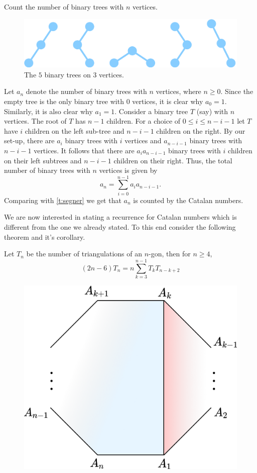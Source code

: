 \begin{question}
Count the number of binary trees with $n$ vertices.
\end{question}
\begin{figure}[H]
    \centering
    \includegraphics[width=0.7\linewidth]{Images/Figure23.png}
    \caption{The $5$ binary trees on $3$ vertices.}
\end{figure}
\begin{solution}
Let $a_n$ denote the number of binary trees with $n$ vertices, where $n\geq 0$. Since the empty tree is the only binary tree with $0$ vertices, it is clear why $a_0 = 1$. Similarly, it is also clear why $a_1=1$. Consider a binary tree $T$ (say) with $n$ vertices. The root of $T$ has $n-1$ children. For a choice of $0\leq i\leq n-i-1$ let $T$ have $i$ children on the left sub-tree and $n-i-1$ children on the right. By our set-up, there are $a_i$ binary trees with $i$ vertices and $a_{n-i-1}$ binary trees with $n-i-1$ vertices. It follows that there are $a_i a_{n-i-1}$ binary trees with $i$ children on their left subtrees and $n-i-1$ children on their right. Thus, the total number of binary trees with $n$ vertices is given by
\[
a_n = \sum_{i=0}^{n-1}a_ia_{n-i-1}.
\]
Comparing with \cref{t:segner} we get that $a_n$ is counted by the Catalan numbers. 
\end{solution}
We are now interested in stating a recurrence for Catalan numbers which is different from the one we already stated. To this end consider the following theorem and it's corollary. 
\begin{theorem}
    Let $T_n$ be the number of triangulations of an $n$-gon, then for $n\geq 4$,
    \[
    (2n-6)T_n = n\sum_{k=3}^{n-1}T_kT_{n-k+2}
    \]
\end{theorem}
\begin{figure}[H]
    \centering
    \includegraphics[width=0.45\linewidth]{Images/Figure22.png}
    \caption{}
    \label{f:Segner2f}
\end{figure}
